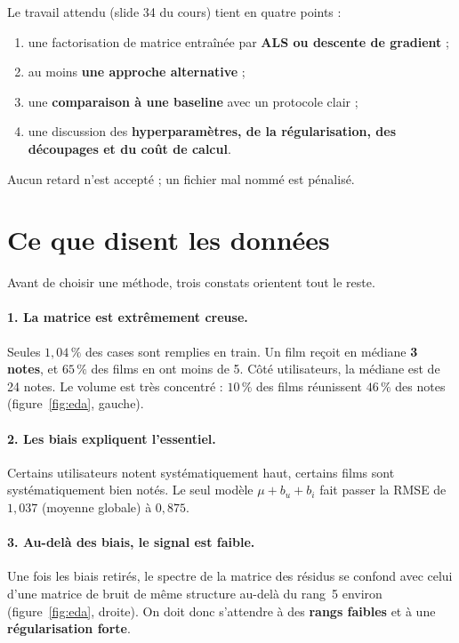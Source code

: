 \documentclass[11pt,a4paper]{article}
\begin{document}
\begin{retenir}
Le travail attendu (slide 34 du cours) tient en quatre points :
\begin{enumerate}[label=\arabic*.]
  \item une factorisation de matrice entraînée par \textbf{ALS ou descente de gradient} ;
  \item au moins \textbf{une approche alternative} ;
  \item une \textbf{comparaison à une baseline} avec un protocole clair ;
  \item une discussion des \textbf{hyperparamètres, de la régularisation, des
        découpages et du coût de calcul}.
\end{enumerate}
Aucun retard n'est accepté ; un fichier mal nommé est pénalisé.
\end{retenir}

\section{Ce que disent les données}

Avant de choisir une méthode, trois constats orientent tout le reste.

\paragraph{1. La matrice est extrêmement creuse.} Seules $1{,}04\,\%$ des cases
sont remplies en train. Un film reçoit en médiane \textbf{3 notes}, et $65\,\%$
des films en ont moins de 5. Côté utilisateurs, la médiane est de 24 notes. Le
volume est très concentré : $10\,\%$ des films réunissent $46\,\%$ des notes
(figure~\ref{fig:eda}, gauche).

\paragraph{2. Les biais expliquent l'essentiel.} Certains utilisateurs notent
systématiquement haut, certains films sont systématiquement bien notés. Le seul
modèle $\mu + b_u + b_i$ fait passer la RMSE de $1{,}037$ (moyenne globale) à
$0{,}875$.

\paragraph{3. Au-delà des biais, le signal est faible.} Une fois les biais
retirés, le spectre de la matrice des résidus se confond avec celui d'une
matrice de bruit de même structure au-delà du rang~5 environ
(figure~\ref{fig:eda}, droite). On doit donc s'attendre à des \textbf{rangs
faibles} et à une \textbf{régularisation forte}.
\end{document}
